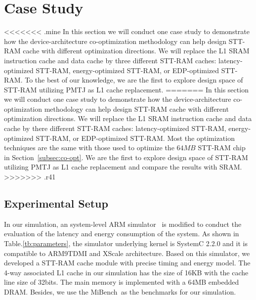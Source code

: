 \section{Case Study} \label{sec:case}
<<<<<<< .mine
In this section we will conduct one case study to demonstrate how the device-architecture co-optimization methodology can help design STT-RAM cache with different optimization directions. We will replace the L1 SRAM instruction cache and data cache by three different STT-RAM caches: latency-optimized STT-RAM, energy-optimized STT-RAM, or EDP-optimized STT-RAM. To the best of our knowledge, we are the first to explore design space of STT-RAM utilizing PMTJ as L1 cache replacement. 
=======
In this section we will conduct one case study to demonstrate how the device-architecture co-optimization methodology can help design STT-RAM cache with different optimization directions. We will replace the L1 SRAM instruction cache and data cache by there different STT-RAM caches: latency-optimized STT-RAM, energy-optimized STT-RAM, or EDP-optimized STT-RAM. Most the optimization techniques are the same with those used to optimize the $64MB$ STT-RAM chip in Section~\ref{subsec:co-opt}. We are the first to explore design space of STT-RAM utilizing PMTJ as L1 cache replacement and compare the results with SRAM.
>>>>>>> .r41

\subsection{Experimental Setup}
In our simulation, an system-level ARM simulator~\cite{FaCSim} is modified to conduct the evaluation of the latency and energy consumption of the system. As shown in Table.\ref{tb:parameters}, the simulator underlying kernel is SystemC 2.2.0 and it is compatible to ARM9TDMI and XScale architecture. Based on this simulator, we developed a STT-RAM cache module with precise timing and energy model. The 4-way associated  L1 cache in our simulation has the size of 16KB with the cache line size of 32bits. The main memory is implemented with a 64MB embedded DRAM. Besides, we use the MiBench~\cite{MiBench}as the benchmarks for our simulation.

